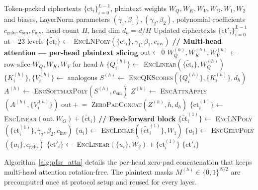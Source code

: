 \begin{algorithm}[htbp]
\caption{\textsc{EncryptLayer} --- one PF-SR encoder layer (model-agnostic)}
\label{alg:pfsr_layer}
\begin{algorithmic}[1]
\REQUIRE Token-packed ciphertexts $\{\mathrm{ct}_i\}_{i=0}^{L-1}$, plaintext weights $W_Q,W_K,W_V,W_O,W_1,W_2$ and biases, LayerNorm parameters $(\gamma_1,\beta_1),(\gamma_2,\beta_2)$, polynomial coefficients $c_{\mathrm{gelu}}, c_{\mathrm{sm}}, c_{\mathrm{inv}}$, head count $H$, head dim $d_h = d/H$
\ENSURE Updated ciphertexts $\{\mathrm{ct}'_i\}_{i=0}^{L-1}$ at $-23$ levels
\STATE $\{\tilde{\mathrm{ct}}_i\} \gets$ \textsc{EncLNPoly}$(\{\mathrm{ct}_i\}, \gamma_1, \beta_1, c_{\mathrm{inv}})$ 
\STATE \textbf{// Multi-head attention --- per-head plaintext slicing}
\STATE $\mathrm{out} \gets 0$
    \STATE $W_Q^{(h)}, W_K^{(h)}, W_V^{(h)} \gets$ row-slice $W_Q,W_K,W_V$ for head $h$
    \STATE $\{Q_i^{(h)}\} \gets$ \textsc{EncLinear}$(\{\tilde{\mathrm{ct}}_i\}, W_Q^{(h)})$ 
    \STATE $\{K_i^{(h)}\}, \{V_i^{(h)}\} \gets$ analogous
    \STATE $S^{(h)} \gets$ \textsc{EncQKScores}$(\{Q_i^{(h)}\}, \{K_i^{(h)}\}, d_h)$ 
    \STATE $A^{(h)} \gets$ \textsc{EncSoftmaxPoly}$(S^{(h)}, c_{\mathrm{sm}})$ 
    \STATE $Z^{(h)} \gets$ \textsc{EncAttnApply}$(A^{(h)}, \{V_i^{(h)}\})$ 
    \STATE $\mathrm{out} \mathrel{+}=$ \textsc{ZeroPadConcat}$(Z^{(h)}, h, d_h)$ 
\ENDFOR
\STATE $\{\mathrm{ct}^{(1)}_i\} \gets$ \textsc{EncLinear}$(\mathrm{out}, W_O) + \{\tilde{\mathrm{ct}}_i\}$ 
\STATE \textbf{// Feed-forward block}
\STATE $\{\tilde{\mathrm{ct}}^{(1)}_i\} \gets$ \textsc{EncLNPoly}$(\{\mathrm{ct}^{(1)}_i\}, \gamma_2, \beta_2, c_{\mathrm{inv}})$ 
\STATE $\{u_i\} \gets$ \textsc{EncLinear}$(\{\tilde{\mathrm{ct}}^{(1)}_i\}, W_1)$ 
\STATE $\{u_i\} \gets$ \textsc{EncGeluPoly}$(\{u_i\}, c_{\mathrm{gelu}})$ 
\STATE $\{\mathrm{ct}'_i\} \gets$ \textsc{EncLinear}$(\{u_i\}, W_2) + \{\mathrm{ct}^{(1)}_i\}$ 
\RETURN $\{\mathrm{ct}'_i\}$
\end{algorithmic}
\end{algorithm}

Algorithm~\ref{alg:pfsr_attn} details the per-head zero-pad concatenation that keeps multi-head attention rotation-free. The plaintext masks $M^{(h)} \in \{0,1\}^{N/2}$ are precomputed once at protocol setup and reused for every layer.

